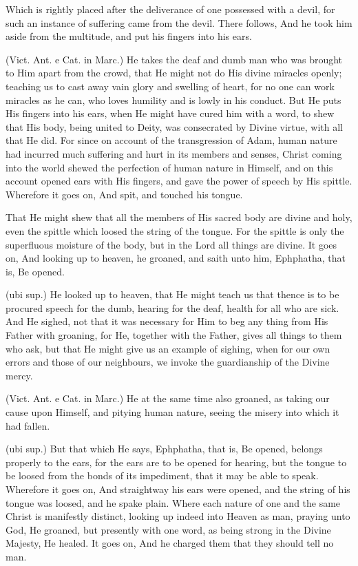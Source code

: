  Which is rightly placed after the deliverance of one possessed with a devil, for such an instance of suffering came from the devil. There follows, And he took him aside from the multitude, and put his fingers into his ears.

 (Vict. Ant. e Cat. in Marc.) He takes the deaf and dumb man who was brought to Him apart from the crowd, that He might not do His divine miracles openly; teaching us to cast away vain glory and swelling of heart, for no one can work miracles as he can, who loves humility and is lowly in his conduct. But He puts His fingers into his ears, when He might have cured him with a word, to shew that His body, being united to Deity, was consecrated by Divine virtue, with all that He did. For since on account of the transgression of Adam, human nature had incurred much suffering and hurt in its members and senses, Christ coming into the world shewed the perfection of human nature in Himself, and on this account opened ears with His fingers, and gave the power of speech by His spittle. Wherefore it goes on, And spit, and touched his tongue.

 That He might shew that all the members of His sacred body are divine and holy, even the spittle which loosed the string of the tongue. For the spittle is only the superfluous moisture of the body, but in the Lord all things are divine. It goes on, And looking up to heaven, he groaned, and saith unto him, Ephphatha, that is, Be opened.

 (ubi sup.) He looked up to heaven, that He might teach us that thence is to be procured speech for the dumb, hearing for the deaf, health for all who are sick. And He sighed, not that it was necessary for Him to beg any thing from His Father with groaning, for He, together with the Father, gives all things to them who ask, but that He might give us an example of sighing, when for our own errors and those of our neighbours, we invoke the guardianship of the Divine mercy.

 (Vict. Ant. e Cat. in Marc.) He at the same time also groaned, as taking our cause upon Himself, and pitying human nature, seeing the misery into which it had fallen.

 (ubi sup.) But that which He says, Ephphatha, that is, Be opened, belongs properly to the ears, for the ears are to be opened for hearing, but the tongue to be loosed from the bonds of its impediment, that it may be able to speak. Wherefore it goes on, And straightway his ears were opened, and the string of his tongue was loosed, and he spake plain. Where each nature of one and the same Christ is manifestly distinct, looking up indeed into Heaven as man, praying unto God, He groaned, but presently with one word, as being strong in the Divine Majesty, He healed. It goes on, And he charged them that they should tell no man.

